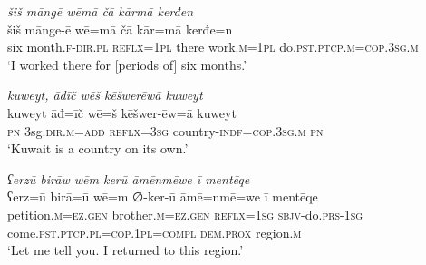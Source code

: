 \ea \label{ŽM.35}
\textit{šiš māngē wēmā čā kārmā kerđen} \\ 
\gll šiš mānge-ē wē=mā čā kār=mā kerđe=n \\ 
 six month\textsc{.f}\textsc{-dir}\textsc{.pl} \textsc{reflx}\textsc{=\textsc{1pl}} there work\textsc{.m}\textsc{=\textsc{1pl}} do\textsc{.pst}\textsc{.ptcp}\textsc{.m}\textsc{=cop}\textsc{.3sg}\textsc{.m} \\ 
\glt `I worked there for [periods of] six months.'
\z 
 
\ea \label{ŽM.42}
\textit{kuweyt, āđīč wēš kēšwerēwā kuweyt} \\ 
\gll kuweyt āđ=īč wē=š kēšwer-ēw=ā kuweyt \\ 
 \textsc{pn} 3sg\textsc{.dir}\textsc{.m}\textsc{=add} \textsc{reflx}\textsc{=3sg} country\textsc{-indf}\textsc{=cop}\textsc{.3sg}\textsc{.m} \textsc{pn} \\ 
\glt `Kuwait is a country on its own.'
\z 
 
\ea \label{ŽM.53}
\textit{ʕerzū birāw wēm kerū āmēnmēwe ī mentēqe} \\ 
\gll ʕerz=ū birā=ū wē=m ∅-ker-ū āmē=nmē=we ī mentēqe \\ 
 petition\textsc{.m}\textsc{=ez.gen} brother\textsc{.m}\textsc{=ez.gen} \textsc{reflx}\textsc{=\textsc{1sg}} \textsc{sbjv-}do\textsc{.prs}\textsc{-\textsc{1sg}} come\textsc{.pst}\textsc{.ptcp}\textsc{.pl}\textsc{=cop}\textsc{.\textsc{1pl}}\textsc{=compl} \textsc{dem.prox} region\textsc{.m} \\ 
\glt `Let me tell you. I returned to this region.'
\z 
 

